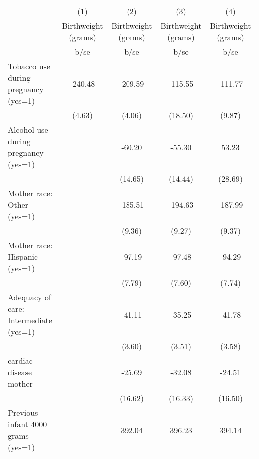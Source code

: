 {
\def\sym#1{\ifmmode^{#1}\else\(^{#1}\)\fi}
\begin{tabular}{l*{4}{c}}
\hline\hline
                                                  &\multicolumn{1}{c}{(1)}&\multicolumn{1}{c}{(2)}&\multicolumn{1}{c}{(3)}&\multicolumn{1}{c}{(4)}\\
                                                  &\multicolumn{1}{c}{Birthweight (grams)}&\multicolumn{1}{c}{Birthweight (grams)}&\multicolumn{1}{c}{Birthweight (grams)}&\multicolumn{1}{c}{Birthweight (grams)}\\
                                                  &        b/se&        b/se&        b/se&        b/se\\
\hline
Tobacco use during pregnancy (yes=1)              &     -240.48&     -209.59&     -115.55&     -111.77\\
                                                  &      (4.63)&      (4.06)&     (18.50)&      (9.87)\\
Alcohol use during pregnancy (yes=1)              &            &      -60.20&      -55.30&       53.23\\
                                                  &            &     (14.65)&     (14.44)&     (28.69)\\
Mother race: Other (yes=1)                        &            &     -185.51&     -194.63&     -187.99\\
                                                  &            &      (9.36)&      (9.27)&      (9.37)\\
Mother race: Hispanic (yes=1)                     &            &      -97.19&      -97.48&      -94.29\\
                                                  &            &      (7.79)&      (7.60)&      (7.74)\\
Adequacy of care: Intermediate (yes=1)            &            &      -41.11&      -35.25&      -41.78\\
                                                  &            &      (3.60)&      (3.51)&      (3.58)\\
cardiac disease mother                            &            &      -25.69&      -32.08&      -24.51\\
                                                  &            &     (16.62)&     (16.33)&     (16.50)\\
Previous infant 4000+ grams (yes=1)               &            &      392.04&      396.23&      394.14\\

\end{tabular}}
